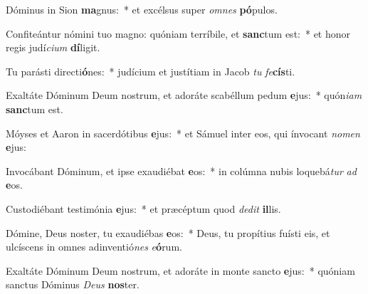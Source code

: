 \item Dóminus in Sion \textbf{ma}gnus:~* et excélsus super \textit{om}\textit{nes} \textbf{pó}pulos.
\item Confiteántur nómini tuo magno: quóniam terríbile, et \textbf{sanc}tum est:~* et honor regis judí\textit{ci}\textit{um} \textbf{dí}ligit.
\item Tu parásti directi\textbf{ó}nes:~* judícium et justítiam in Jacob \textit{tu} \textit{fe}\textbf{cís}ti.
\item Exaltáte Dóminum Deum nostrum, et adoráte scabéllum pedum \textbf{e}jus:~* quón\textit{i}\textit{am} \textbf{sanc}tum est.
\item Móyses et Aaron in sacerdótibus \textbf{e}jus:~* et Sámuel inter eos, qui ínvocant \textit{no}\textit{men} \textbf{e}jus:
\item Invocábant Dóminum, et ipse exaudiébat \textbf{e}os:~* in colúmna nubis loquebá\textit{tur} \textit{ad} \textbf{e}os.
\item Custodiébant testimónia \textbf{e}jus:~* et præcéptum quod \textit{de}\textit{dit} \textbf{il}lis.
\item Dómine, Deus noster, tu exaudiébas \textbf{e}os:~* Deus, tu propítius fuísti eis, et ulcíscens in omnes adinventió\textit{nes} \textit{e}\textbf{ó}rum.
\item Exaltáte Dóminum Deum nostrum, et adoráte in monte sancto \textbf{e}jus:~* quóniam sanctus Dóminus \textit{De}\textit{us} \textbf{nos}ter.
